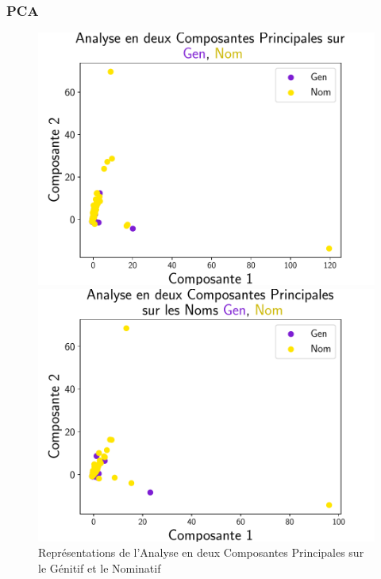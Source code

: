 \documentclass[noamsthm]{beamercours}
\begin{document}
\begin{frame}
\frametitle{PCA}\label{subsub:pca}
\begin{figure}
	\begin{minipage}{.45\textwidth}
	\begin{center}
	\includegraphics[width=\linewidth]{Figures/Visualisations/pca_Gen_Nom}
	\end{center}
	\end{minipage}
	\begin{minipage}{.45\textwidth}
	\begin{center}
	\includegraphics[width=\linewidth]{Figures/Visualisations/pca_Gen_Nom_Nouns}
	\end{center}
	\end{minipage}
	\caption{Représentations de l'Analyse en deux Composantes Principales sur le Génitif et le Nominatif}
	\label{fig:pca}
\end{figure}
\end{frame}
\end{document}
